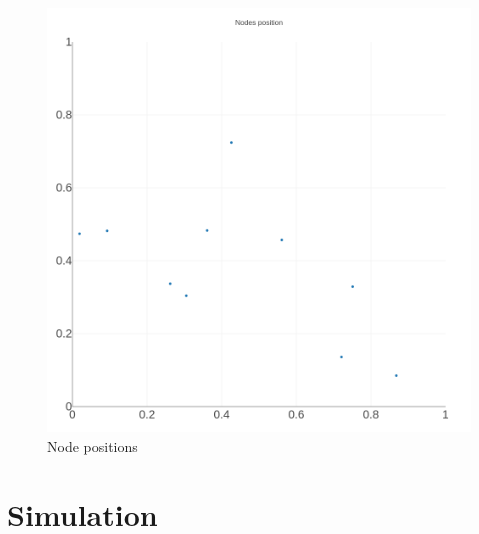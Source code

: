 \documentclass[conference]{IEEEtran}
\begin{document}
\begin{figure}[h]
    \centering
    \includegraphics[width=\columnwidth]{graphs/NodesPositions}
    \caption{Node positions}
    \label{fig:nodespositions}
\end{figure}

\section{Simulation}\label{sec:simulation}
\end{document}
